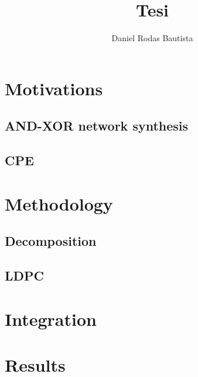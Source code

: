 \documentclass{article}
\title{Tesi}
\author{Daniel Rodas Bautista}
\begin{document}
\chapter{Motivations}
    \section{AND-XOR network synthesis}
    \section{CPE}

\chapter{Methodology}
    \section{Decomposition}
    \section{LDPC}

\chapter{Integration}

\chapter{Results}
\end{document}
